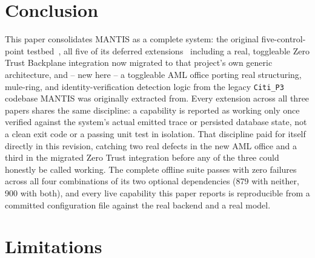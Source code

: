 \documentclass[conference]{IEEEtran}
\begin{document}
\section{Conclusion}
\label{sec:conclusion}

This paper consolidates MANTIS as a complete system: the original five-control-point testbed~\cite{mantis_paper1}, all five of its deferred extensions~\cite{mantis_paper2} including a real, toggleable Zero Trust Backplane integration now migrated to that project's own generic architecture, and -- new here -- a toggleable AML office porting real structuring, mule-ring, and identity-verification detection logic from the legacy \texttt{Citi\_P3} codebase MANTIS was originally extracted from. Every extension across all three papers shares the same discipline: a capability is reported as working only once verified against the system's actual emitted trace or persisted database state, not a clean exit code or a passing unit test in isolation. That discipline paid for itself directly in this revision, catching two real defects in the new AML office and a third in the migrated Zero Trust integration before any of the three could honestly be called working. The complete offline suite passes with zero failures across all four combinations of its two optional dependencies (879 with neither, 900 with both), and every live capability this paper reports is reproducible from a committed configuration file against the real backend and a real model.

\section*{Limitations}
\end{document}
